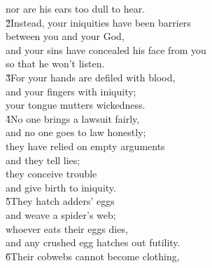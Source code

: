 \begin{poetry}
\poemll    nor are his ears too dull to hear. \\
\poeml \v{2}Instead, your iniquities have been barriers \\
\poemll    between you and your God, \\
\poeml and your sins have concealed his face from you \\
\poemll    so that he won't listen. \\
\poeml \v{3}For your hands are defiled with blood, \\
\poemll    and your fingers with iniquity; \\
\poemlll       your tongue mutters wickedness. \\
\poeml \v{4}No one brings a lawsuit fairly, \\
\poemll    and no one goes to law honestly; \\
\poeml they have relied on empty arguments \\
\poemll    and they tell lies; \\
\poeml they conceive trouble \\
\poemll    and give birth to iniquity. \\
\poeml \v{5}They hatch adders' eggs \\
\poemll    and weave a spider's web; \\
\poeml whoever eats their eggs dies, \\
\poemll    and any crushed egg hatches out futility. \\
\poeml \v{6}Their cobwebs cannot become clothing, \\

\end{poetry}
